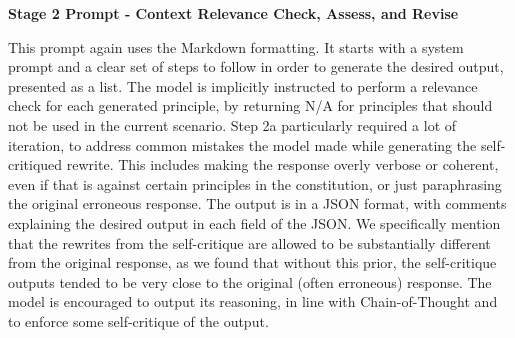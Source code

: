 \documentclass[11pt]{article}
\begin{document}
\textbf{Stage 2 Prompt - Context Relevance Check, Assess, and Revise} \label{sec:principle-adherence-stage2}

This prompt again uses the Markdown formatting. It starts with a system prompt and a clear set of steps to follow in order to generate the desired output, presented as a list.  The model is implicitly instructed to perform a relevance check for each generated principle, by returning N/A for principles that should not be used in the current scenario. Step 2a particularly required a lot of iteration, to address common mistakes the model made while generating the self-critiqued rewrite. This includes making the response overly verbose or coherent, even if that is against certain principles in the constitution, or just paraphrasing the original erroneous response. The output is in a JSON format, with comments explaining the desired output in each field of the JSON. We specifically mention that the rewrites from the self-critique are allowed to be substantially different from the original response, as we found that without this prior, the self-critique outputs tended to be very close to the original (often erroneous) response. The model is encouraged to output its reasoning, in line with Chain-of-Thought and to enforce some self-critique of the output. 
\end{document}
